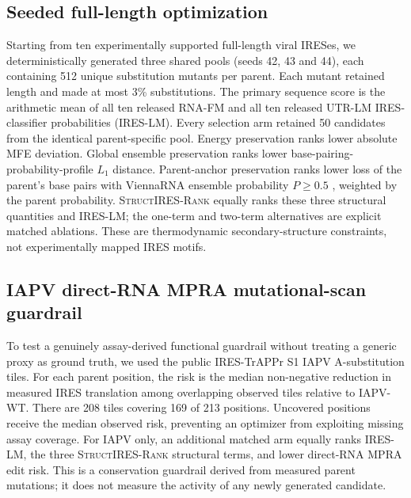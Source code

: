 \subsection{Seeded full-length optimization}
Starting from ten experimentally supported full-length viral IRESes, we deterministically generated
three shared pools (seeds 42, 43 and 44), each containing 512 unique substitution mutants per parent.
Each mutant retained length and made at most 3\% substitutions. The primary sequence score is the
arithmetic mean of all ten released RNA-FM and all ten released UTR-LM IRES-classifier probabilities
(IRES-LM). Every selection arm retained 50 candidates from the identical parent-specific pool.
Energy preservation ranks lower absolute MFE deviation. Global ensemble preservation ranks lower
base-pairing-probability-profile $L_1$ distance. Parent-anchor preservation ranks lower loss of the
parent's base pairs with ViennaRNA ensemble probability $P\geq0.5$ \cite{lorenz2011viennarna}, weighted by the parent
probability. \textsc{StructIRES-Rank} equally ranks these three structural quantities and IRES-LM;
the one-term and two-term alternatives are explicit matched ablations. These are thermodynamic
secondary-structure constraints, not experimentally mapped IRES motifs.

\subsection{IAPV direct-RNA MPRA mutational-scan guardrail}
To test a genuinely assay-derived functional guardrail without treating a generic proxy as ground
truth, we used the public IRES-TrAPPr S1 IAPV A-substitution tiles. For each parent position, the
risk is the median non-negative reduction in measured IRES translation among overlapping observed
tiles relative to IAPV-WT. There are 208 tiles covering 169 of 213 positions. Uncovered positions
receive the median observed risk, preventing an optimizer from exploiting missing assay coverage.
For IAPV only, an additional matched arm equally ranks IRES-LM, the three \textsc{StructIRES-Rank}
structural terms, and lower direct-RNA MPRA edit risk. This is a conservation guardrail derived from
measured parent mutations; it does not measure the activity of any newly generated candidate.


